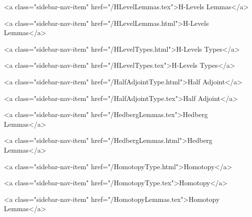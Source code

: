       
        
          <a class="sidebar-nav-item" href="/HLevelLemmas.tex">H-Levels Lemmas</a>
        
      
    
      
        
          <a class="sidebar-nav-item" href="/HLevelLemmas.html">H-Levels Lemmas</a>
        
      
    
      
        
          <a class="sidebar-nav-item" href="/HLevelTypes.html">H-Levels Types</a>
        
      
    
      
        
          <a class="sidebar-nav-item" href="/HLevelTypes.tex">H-Levels Types</a>
        
      
    
      
        
          <a class="sidebar-nav-item" href="/HalfAdjointType.html">Half Adjoint</a>
        
      
    
      
        
          <a class="sidebar-nav-item" href="/HalfAdjointType.tex">Half Adjoint</a>
        
      
    
      
        
          <a class="sidebar-nav-item" href="/HedbergLemmas.tex">Hedberg Lemmas</a>
        
      
    
      
        
          <a class="sidebar-nav-item" href="/HedbergLemmas.html">Hedberg Lemmas</a>
        
      
    
      
        
          <a class="sidebar-nav-item" href="/HomotopyType.html">Homotopy</a>
        
      
    
      
        
          <a class="sidebar-nav-item" href="/HomotopyType.tex">Homotopy</a>
        
      
    
      
        
          <a class="sidebar-nav-item" href="/HomotopyLemmas.tex">Homotopy Lemmas</a>
        
      
    
